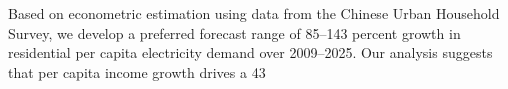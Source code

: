 Based on econometric estimation using data from the Chinese Urban Household Survey, we develop a preferred forecast range of 85–143 percent growth in residential per capita electricity demand over 2009–2025. Our analysis suggests that per capita income growth drives a 43%